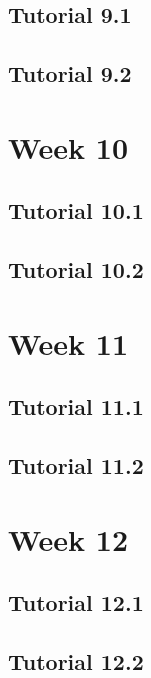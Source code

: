 \documentclass{article}
\begin{document}
\begin{multicols}{2}
\subsection{Tutorial 9.1}
\subsection{Tutorial 9.2}
\section{Week 10}
\subsection{Tutorial 10.1}
\subsection{Tutorial 10.2}
\section{Week 11}
\subsection{Tutorial 11.1}
\subsection{Tutorial 11.2}
\section{Week 12}
\subsection{Tutorial 12.1}
\subsection{Tutorial 12.2}

\end{multicols}
\end{document}
